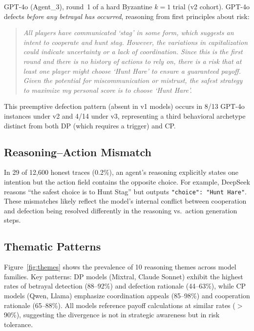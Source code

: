 \documentclass[runningheads]{llncs}
\begin{document}
GPT-4o (Agent\_3), round~1 of a hard Byzantine $k{=}1$ trial (v2 cohort). GPT-4o defects \emph{before any betrayal has occurred}, reasoning from first principles about risk:

\begin{quote}
\small\itshape
All players have communicated `stag' in some form, which suggests an intent to cooperate and hunt stag. However, the variations in capitalization could indicate uncertainty or a lack of coordination. Since this is the first round and there is no history of actions to rely on, there is a risk that at least one player might choose `Hunt Hare' to ensure a guaranteed payoff. Given the potential for miscommunication or mistrust, the safest strategy to maximize my personal score is to choose `Hunt Hare'.
\end{quote}

This preemptive defection pattern (absent in v1 models) occurs in 8/13 GPT-4o instances under v2 and 4/14 under v3, representing a third behavioral archetype distinct from both DP (which requires a trigger) and CP.

\subsection{Reasoning--Action Mismatch}

In 29 of 12,600 honest traces (0.2\%), an agent's reasoning explicitly states one intention but the action field contains the opposite choice. For example, DeepSeek reasons ``the safest choice is to Hunt Stag'' but outputs \texttt{"choice": "Hunt Hare"}. These mismatches likely reflect the model's internal conflict between cooperation and defection being resolved differently in the reasoning vs.\ action generation steps.

\subsection{Thematic Patterns}

Figure~\ref{fig:themes} shows the prevalence of 10 reasoning themes across model families. Key patterns: DP models (Mixtral, Claude Sonnet) exhibit the highest rates of betrayal detection (88--92\%) and defection rationale (44--63\%), while CP models (Qwen, Llama) emphasize coordination appeals (85--98\%) and cooperation rationale (65--88\%). All models reference payoff calculations at similar rates ($>$90\%), suggesting the divergence is not in strategic awareness but in risk tolerance.
\end{document}
